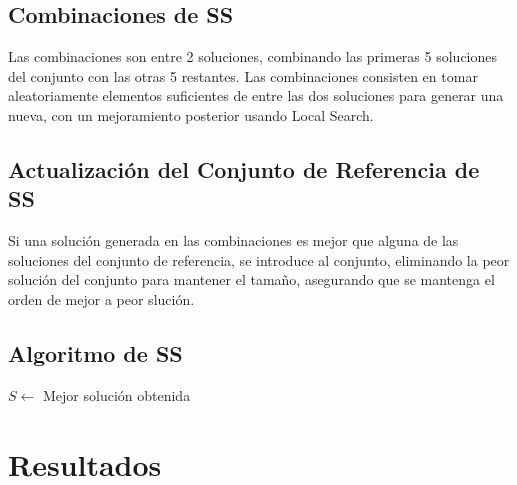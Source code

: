 \documentclass{ci5652}
\begin{document}
\subsection{Combinaciones de SS}
Las combinaciones son entre 2 soluciones, combinando las primeras 5 soluciones del conjunto con las otras 5 restantes. Las combinaciones consisten en tomar aleatoriamente elementos suficientes de entre las dos soluciones para generar una nueva, con un mejoramiento posterior usando Local Search.

\subsection{Actualización del Conjunto de Referencia de SS}
Si una solución generada en las combinaciones es mejor que alguna de las soluciones del conjunto de referencia, se introduce al conjunto, eliminando la peor solución del conjunto para mantener el tamaño, asegurando que se mantenga el orden de mejor a peor slución.

\subsection{Algoritmo de SS}

\begin{algorithm}[h!]
\DontPrintSemicolon
$S \leftarrow$ Mejor solución obtenida\;
\end{algorithm}

\section{Resultados}
\end{document}
